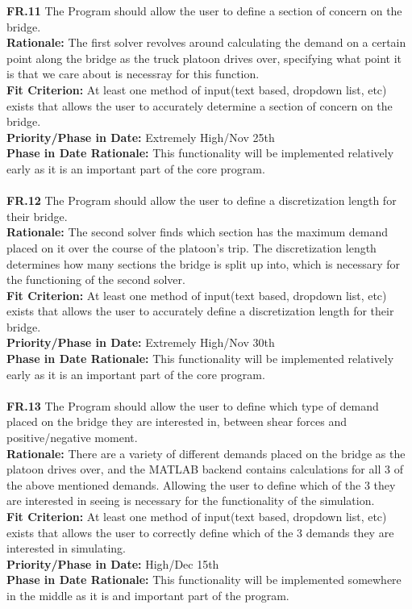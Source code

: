 \documentclass[12pt]{article}
\begin{document}
  \noindent\textbf{FR.11} The Program should allow the user to define a section of concern on the bridge.\\
  \textbf{Rationale:} The first solver revolves around calculating the demand on a certain point along the bridge as the truck platoon drives over, specifying what point it is
  that we care about is necessray for this function.\\
  \textbf{Fit Criterion:} At least one method of input(text based, dropdown list, etc) exists that allows the user to accurately determine a section of concern on the bridge.\\
  \textbf{Priority/Phase in Date:} Extremely High/Nov 25th\\
  \textbf{Phase in Date Rationale:} This functionality will be implemented relatively early as it is an important part of the core program.\\\\

  \noindent\textbf{FR.12} The Program should allow the user to define a discretization length for their bridge.\\
  \textbf{Rationale:} The second solver finds which section has the maximum demand placed on it over the course of the platoon's trip. The discretization length determines how
  many sections the bridge is split up into, which is necessary for the functioning of the second solver.\\
  \textbf{Fit Criterion:} At least one method of input(text based, dropdown list, etc) exists that allows the user to accurately define a discretization length for their bridge.\\
  \textbf{Priority/Phase in Date:} Extremely High/Nov 30th\\
  \textbf{Phase in Date Rationale:} This functionality will be implemented relatively early as it is an important part of the core program.\\\\

  \noindent\textbf{FR.13} The Program should allow the user to define which type of demand placed on the bridge they are interested in, between shear forces and positive/negative moment.\\
  \textbf{Rationale:} There are a variety of different demands placed on the bridge as the platoon drives over, and the MATLAB backend contains calculations for all 3 of the
  above mentioned demands. Allowing the user to define which of the 3 they are interested in seeing is necessary for the functionality of the simulation.\\
  \textbf{Fit Criterion:} At least one method of input(text based, dropdown list, etc) exists that allows the user to correctly define which of the 3 demands they are interested in
  simulating.\\
  \textbf{Priority/Phase in Date:} High/Dec 15th\\
  \textbf{Phase in Date Rationale:} This functionality will be implemented somewhere in the middle as it is and important part of the program.\\\\
\end{document}
